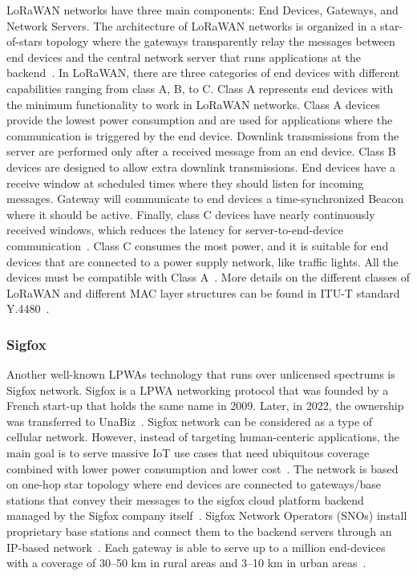 \documentclass[]{IEEEtran}
\begin{document}
LoRaWAN networks have three main components: End Devices, Gateways, and Network Servers.
The architecture of LoRaWAN networks is organized in a star-of-stars topology where the gateways transparently relay the messages between end devices and the central network server that runs applications at the backend~\cite{LoRaWAN_spec}.
In LoRaWAN, there are three categories of end devices with different capabilities ranging from class A, B, to C\cite{ding_iot_2020}.
Class A represents end devices with the minimum functionality to work in LoRaWAN networks.
Class A devices provide the lowest power consumption and are used for applications where the communication is triggered by the end device.
Downlink transmissions from the server are performed only after a received message from an end device.
Class B devices are designed to allow extra downlink transmissions.
End devices have a receive window at scheduled times where they should listen for incoming messages.
Gateway will communicate to end devices a time-synchronized Beacon where it should be active.
Finally, class C devices have nearly continuously received windows, which reduces the latency for server-to-end-device communication~\cite{LoRaWAN_spec}.
Class C consumes the most power, and it is suitable for end devices that are connected to a power supply network, like traffic lights.
All the devices must be compatible with Class A~\cite{haxhibeqiri2018survey}.
More details on the different classes of LoRaWAN and different MAC layer structures can be found in ITU-T standard Y.4480~\cite{ITU-T-Y.4480}.

\subsubsection{Sigfox}
\label{sec:2-1-2}
Another well-known LPWAs technology that runs over unlicensed spectrums is Sigfox network.
Sigfox is a LPWA networking protocol that was founded by a French start-up that holds the same name in 2009.
Later, in 2022, the ownership was transferred to UnaBiz~\cite{grignon_unabiz_2022}. 
Sigfox network can be considered as a type of cellular network.
However, instead of targeting human-centeric applications, the main goal is to serve massive IoT use cases that need ubiquitous coverage combined with lower power consumption and lower cost~\cite{margelis2015low}.
The network is based on one-hop star topology where end devices are connected to gateways/base stations that convey their messages to the sigfox cloud platform backend managed by the Sigfox company itself~\cite{kalfus2016ultra}.
Sigfox Network Operators (SNOs) install proprietary base stations and connect them to the backend servers through an IP-based network~\cite{raza2017low}.
Each gateway is able to serve up to a million end-devices with a coverage of 30–50 km in rural areas and 3–10 km in urban areas~\cite{augustin2016study}.
\end{document}
